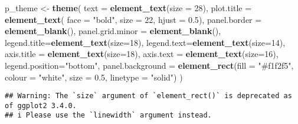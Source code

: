 \documentclass[]{book}
\newenvironment{Shaded}{\begin{snugshade}}{\end{snugshade}}
\newcommand{\DataTypeTok}[1]{\textcolor[rgb]{0.13,0.29,0.53}{#1}}
\newcommand{\DecValTok}[1]{\textcolor[rgb]{0.00,0.00,0.81}{#1}}
\newcommand{\FloatTok}[1]{\textcolor[rgb]{0.00,0.00,0.81}{#1}}
\newcommand{\KeywordTok}[1]{\textcolor[rgb]{0.13,0.29,0.53}{\textbf{#1}}}
\newcommand{\NormalTok}[1]{#1}
\newcommand{\StringTok}[1]{\textcolor[rgb]{0.31,0.60,0.02}{#1}}
\begin{document}
\begin{Shaded}
\begin{Highlighting}[]
\NormalTok{p_theme <-}\StringTok{ }\KeywordTok{theme}\NormalTok{(}
  \DataTypeTok{text =} \KeywordTok{element_text}\NormalTok{(}\DataTypeTok{size =} \DecValTok{28}\NormalTok{),}
  \DataTypeTok{plot.title =} \KeywordTok{element_text}\NormalTok{( }\DataTypeTok{face =} \StringTok{"bold"}\NormalTok{, }\DataTypeTok{size =} \DecValTok{22}\NormalTok{, }\DataTypeTok{hjust =} \FloatTok{0.5}\NormalTok{),}
  \DataTypeTok{panel.border =} \KeywordTok{element_blank}\NormalTok{(),}
  \DataTypeTok{panel.grid.minor =} \KeywordTok{element_blank}\NormalTok{(),}
  \DataTypeTok{legend.title=}\KeywordTok{element_text}\NormalTok{(}\DataTypeTok{size=}\DecValTok{18}\NormalTok{),}
  \DataTypeTok{legend.text=}\KeywordTok{element_text}\NormalTok{(}\DataTypeTok{size=}\DecValTok{14}\NormalTok{),}
  \DataTypeTok{axis.title =} \KeywordTok{element_text}\NormalTok{(}\DataTypeTok{size=}\DecValTok{18}\NormalTok{),}
  \DataTypeTok{axis.text =} \KeywordTok{element_text}\NormalTok{(}\DataTypeTok{size=}\DecValTok{16}\NormalTok{),}
  \DataTypeTok{legend.position=}\StringTok{"bottom"}\NormalTok{,}
  \DataTypeTok{panel.background =} \KeywordTok{element_rect}\NormalTok{(}\DataTypeTok{fill =} \StringTok{"#f1f2f5"}\NormalTok{,}
                                  \DataTypeTok{colour =} \StringTok{"white"}\NormalTok{,}
                                  \DataTypeTok{size =} \FloatTok{0.5}\NormalTok{, }\DataTypeTok{linetype =} \StringTok{"solid"}\NormalTok{)}
\NormalTok{)}
\end{Highlighting}
\end{Shaded}

\begin{verbatim}
## Warning: The `size` argument of `element_rect()` is deprecated as of ggplot2 3.4.0.
## i Please use the `linewidth` argument instead.
\end{verbatim}
\end{document}
